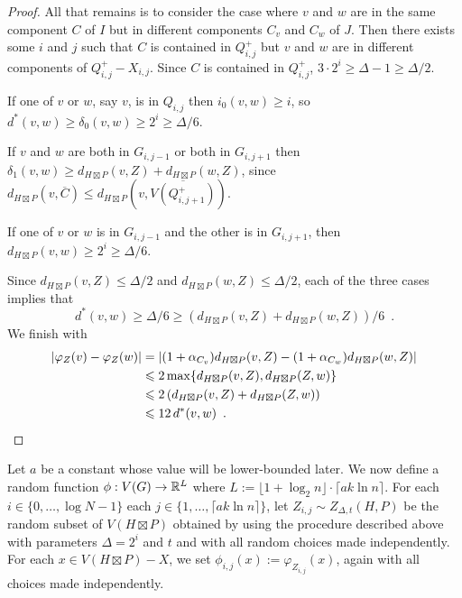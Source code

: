 \documentclass{patmorin}
\renewcommand{\ge}{\geqslant}
\renewcommand{\le}{\leqslant}
\begin{document}
\begin{proof}
  All that remains is to consider the case where $v$ and $w$ are in the same component $C$ of $I$ but in different components $C_v$ and $C_w$ of $J$.  Then there exists some $i$ and $j$ such that $C$ is contained in $Q^+_{i,j}$ but $v$ and $w$ are in different components of $Q^+_{i,j}-X_{i,j}$.  Since $C$ is contained in $Q^+_{i,j}$, $3\cdot 2^{i} \ge \Delta-1\ge \Delta/2$.
  \begin{compactitem}
    \item If one of $v$ or $w$, say $v$, is in $Q_{i,j}$ then $i_0(v,w)\ge i$, so $d^*(v,w)\ge \delta_0(v,w)\ge 2^i\ge \Delta/6$.
    \item If $v$ and $w$ are both in $G_{i,j-1}$ or both in $G_{i,j+1}$ then $\delta_1(v,w)\ge d_{H\boxtimes P}(v,Z)+d_{H\boxtimes P}(w,Z)$, since $d_{H\boxtimes P}(v,\overline{C})\le d_{H\boxtimes P}(v,\overline{V(Q^+_{i,j+1})})$.
    \item If one of $v$ or $w$ is in $G_{i,j-1}$ and the other is in $G_{i,j+1}$, then $d_{H\boxtimes P}(v,w)\ge 2^i\ge\Delta/6$.
  \end{compactitem}
  Since $d_{H\boxtimes P}(v,Z)\le \Delta/2$ and $d_{H\boxtimes P}(w,Z)\le \Delta/2$, each of the three cases implies that
  \[
    d^*(v,w) \ge \Delta/6 \ge (d_{H\boxtimes P}(v,Z) + d_{H\boxtimes P}(w,Z))/6 \enspace .
  \]
  We finish with
  \begin{align*}
      |\varphi_Z(v)-\varphi_Z(w)|
      & =|(1+\alpha_{C_v})d_{H\boxtimes P}(v,Z)-(1+\alpha_{C_w})d_{H\boxtimes P}(w,Z)| \\
      & \le 2\max\{d_{H\boxtimes P}(v,Z), d_{H\boxtimes P}(Z,w)\} \\
      & \le 2\left(d_{H\boxtimes P}(v,Z) + d_{H\boxtimes P}(Z,w)\right) \\
      & \le 12\, d^*(v,w) \enspace . \qedhere
  \end{align*}
\end{proof}

Let $a$ be a constant whose value will be lower-bounded later.  We now define a random function $\phi:V(G)\to\mathbb{R}^{L}$ where $L:=\lfloor 1+\log_2 n\rfloor\cdot\lceil a k\ln n\rceil$. For each $i\in\{0,\ldots,\log N-1\}$ each $j\in\{1,\ldots,\lceil a k\ln n\rceil\}$, let $Z_{i,j}\sim Z_{\Delta,t}(H,P)$ be the random subset of $V(H\boxtimes P)$ obtained by using the procedure described above with parameters $\Delta=2^i$ and $t$ and with all random choices made independently.  For each $x\in V(H\boxtimes P)-X$, we set $\phi_{i,j}(x):= \varphi_{Z_{i,j}}(x)$, again with all choices made independently.
\end{document}
